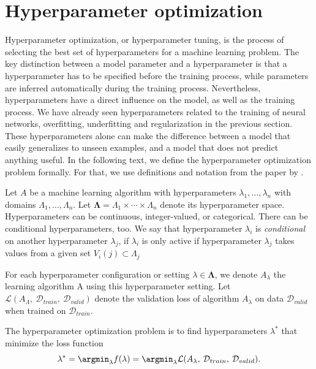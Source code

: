 \section{Hyperparameter optimization} \label{sec:hpo}
Hyperparameter optimization, or hyperparameter tuning, is the process of selecting the best set of hyperparameters for a machine learning problem. The key distinction between a model parameter and a hyperparameter is that a hyperparameter has to be specified before the training process, while parameters are inferred automatically during the training process. Nevertheless, hyperparameters have a direct influence on the model, as well as the training process. We have already seen hyperparameters related to the training of neural networks, overfitting, underfitting and regularization in the previous section. These hyperparameters alone can make the difference between a model that easily generalizes to unseen examples, and a model that does not predict anything useful. In the following text, we define the hyperparameter optimization problem formally. For that, we use definitions and notation from the paper by \citet{eggensperger2013towards}.

Let $A$ be a machine learning algorithm with hyperparameters $\lambda_1, \dots , \lambda_n$ with domains $\Lambda_1,\dots , \Lambda_n$. Let $ \mathbf{\Lambda } = \Lambda_1 \times \cdots \times \Lambda_n$ denote its hyperparameter space. Hyperparameters can be continuous, integer-valued, or categorical. There can be conditional hyperparameters, too. We say that hyperparameter $\lambda_i$ is \emph{conditional} on another hyperparameter $\lambda_j$, if $\lambda_i$ is only active if hyperparameter $\lambda_j$ takes values from a given set $V_i(j) \subset \Lambda_j$

For each hyperparameter configuration or setting $\lambda \in \mathbf{\Lambda}$, we denote $A_\lambda$ the learning algorithm A using this hyperparameter setting. Let $\mathcal{L}(A_\Lambda, \: \mathcal{D}_{train}, \: \mathcal{D}_{valid})$ denote the validation loss of algorithm $A_\lambda$ on data $\mathcal{D}_{valid}$ when trained on $\mathcal{D}_{train}$.

\begin{defn}\label{defn:x}
The hyperparameter optimization problem is to find hyperparameters $\lambda^*$ that minimize the loss function  \[\lambda^*=\argmin _\lambda f(\lambda)=\argmin_\lambda \mathcal{L}(A_\lambda, \: \mathcal{D}_{train}, \:  \mathcal{D}_{valid}).\]
\end{defn}

